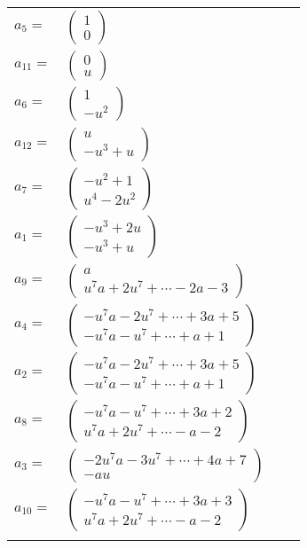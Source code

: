 \documentclass[1p]{elsarticle_modified}
\theoremstyle{definition}
\begin{document}
\begin{tabular}{m{7pt} m{180pt} m{7pt} m{180pt} }
\flushright $a_{5}=$&$\begin{pmatrix}1\\0\end{pmatrix}$ \\
\flushright $a_{11}=$&$\begin{pmatrix}0\\u\end{pmatrix}$ \\
\flushright $a_{6}=$&$\begin{pmatrix}1\\- u^2\end{pmatrix}$ \\
\flushright $a_{12}=$&$\begin{pmatrix}u\\- u^3+u\end{pmatrix}$ \\
\flushright $a_{7}=$&$\begin{pmatrix}- u^2+1\\u^4-2 u^2\end{pmatrix}$ \\
\flushright $a_{1}=$&$\begin{pmatrix}- u^3+2 u\\- u^3+u\end{pmatrix}$ \\
\flushright $a_{9}=$&$\begin{pmatrix}a\\u^7 a+2 u^7+\cdots-2 a-3\end{pmatrix}$ \\
\flushright $a_{4}=$&$\begin{pmatrix}- u^7 a-2 u^7+\cdots+3 a+5\\- u^7 a- u^7+\cdots+a+1\end{pmatrix}$ \\
\flushright $a_{2}=$&$\begin{pmatrix}- u^7 a-2 u^7+\cdots+3 a+5\\- u^7 a- u^7+\cdots+a+1\end{pmatrix}$ \\
\flushright $a_{8}=$&$\begin{pmatrix}- u^7 a- u^7+\cdots+3 a+2\\u^7 a+2 u^7+\cdots- a-2\end{pmatrix}$ \\
\flushright $a_{3}=$&$\begin{pmatrix}-2 u^7 a-3 u^7+\cdots+4 a+7\\- a u\end{pmatrix}$ \\
\flushright $a_{10}=$&$\begin{pmatrix}- u^7 a- u^7+\cdots+3 a+3\\u^7 a+2 u^7+\cdots- a-2\end{pmatrix}$\\&\end{tabular}
\end{document}
